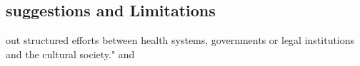 \documentclass[12pt,]{article}
\begin{document}
\cite{UNFPA14, UNIC16}
\subsection{suggestions and Limitations}\label{suggestions-and-Limitations}

out structured efforts between health systems, governments or legal institutions and the cultural society." \cite{Iyio12} and 







\end{document}
